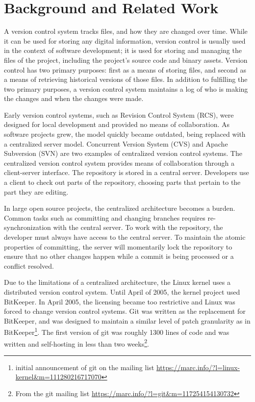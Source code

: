 \chapter{Background and Related Work}\label{chap:background}

A version control system tracks files, and how they are changed over
time.
While it can be used for storing any digital information,
version control is usually used in the context of software development;
it is used for storing and managing the files of the project, including
the project's source code and binary assets.
Version control has two primary purposes: first as a means of storing
files, and second as a means of retrieving historical versions of those
files.
In addition to fulfilling the two primary purposes, a version control
system maintains a log of who is making the changes and when the
changes were made.

Early version control systems, such as Revision Control System (RCS),
were designed for local development and provided no means of collaboration.
As software projects grew, the model quickly became outdated,
being replaced with a centralized server model.
Concurrent Version System (CVS) and Apache Subversion (SVN) are two
examples of centralized version control systems. The centralized version
control system provides means of collaboration through a client-server
interface. The repository is stored in a central server. Developers use
a client to check out parts of the repository, choosing parts that
pertain to the part they are editing.

In large open source projects, the centralized architecture becomes a
burden. Common tasks such as committing and changing branches requires
re-synchronization with the central server.
To work with the repository,
the developer must always have access to the central server.
To maintain the atomic properties of committing, the server will
momentarily lock the repository to ensure that no other changes happen
while a commit is being processed or a conflict resolved.

Due to the limitations of a centralized architecture, the Linux kernel
uses a distributed version control system. Until April of 2005, the
kernel project used BitKeeper.
In April 2005, the licensing became too restrictive and Linux was forced
to change version control systems. 
Git was written as the replacement for BitKeeper, and was designed to
maintain a similar level of patch granularity as in BitKeeper\footnote{
  initial announcement of git on the mailing list
  \url{https://marc.info/?l=linux-kernel&m=111280216717070}}. The first
version of git was roughly 1300 lines of code and was written and
self-hosting in less than two weeks\footnote{From the git mailing list
  \url{https://marc.info/?l=git&m=117254154130732}}.

